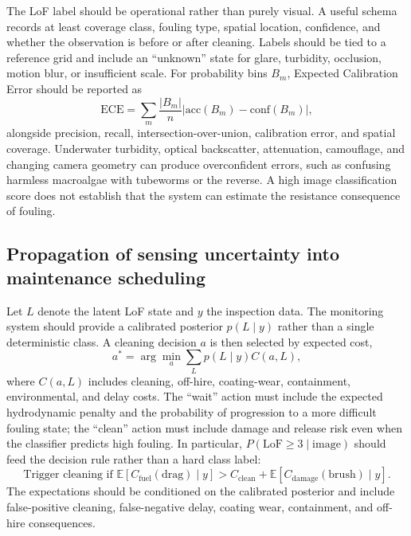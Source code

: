 The LoF label should be operational rather than purely visual. A useful schema records at least coverage class, fouling type, spatial location, confidence, and whether the observation is before or after cleaning. Labels should be tied to a reference grid and include an ``unknown'' state for glare, turbidity, occlusion, motion blur, or insufficient scale. For probability bins $B_m$, Expected Calibration Error should be reported as
\begin{equation}
\mathrm{ECE}=\sum_m\frac{|B_m|}{n}\left|\mathrm{acc}(B_m)-\mathrm{conf}(B_m)\right|,
\end{equation}
alongside precision, recall, intersection-over-union, calibration error, and spatial coverage. Underwater turbidity, optical backscatter, attenuation, camouflage, and changing camera geometry can produce overconfident errors, such as confusing harmless macroalgae with tubeworms or the reverse. A high image classification score does not establish that the system can estimate the resistance consequence of fouling.

\subsection{Propagation of sensing uncertainty into maintenance scheduling}
Let $L$ denote the latent LoF state and $y$ the inspection data. The monitoring system should provide a calibrated posterior $p(L\mid y)$ rather than a single deterministic class. A cleaning decision $a$ is then selected by expected cost,
\begin{equation}
a^* = \arg\min_a \sum_L p(L\mid y) C(a,L),
\end{equation}
where $C(a,L)$ includes cleaning, off-hire, coating-wear, containment, environmental, and delay costs. The ``wait'' action must include the expected hydrodynamic penalty and the probability of progression to a more difficult fouling state; the ``clean'' action must include damage and release risk even when the classifier predicts high fouling. In particular, $P(\mathrm{LoF}\geq3\mid\mathrm{image})$ should feed the decision rule rather than a hard class label:
\begin{equation}
\text{Trigger cleaning if }\mathbb{E}[C_{\mathrm{fuel}}(\mathrm{drag})\mid y] > C_{\mathrm{clean}}+\mathbb{E}[C_{\mathrm{damage}}(\mathrm{brush})\mid y].
\end{equation}
The expectations should be conditioned on the calibrated posterior and include false-positive cleaning, false-negative delay, coating wear, containment, and off-hire consequences.

